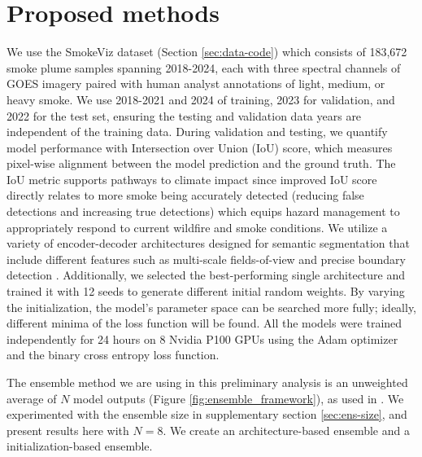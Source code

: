 \documentclass{article}
\begin{document}
\section{Proposed methods} 
We use the SmokeViz dataset (Section \ref{sec:data-code}) which consists of 183,672 smoke plume samples spanning 2018-2024, each with three spectral channels of GOES imagery paired with human analyst annotations of light, medium, or heavy smoke. We use 2018-2021 and 2024 of training, 2023 for validation, and 2022 for the test set, ensuring the testing and validation data years are independent of the training data. During validation and testing, we quantify model performance with Intersection over Union (IoU) score, which measures pixel-wise alignment between the model prediction and the ground truth. The IoU metric supports pathways to climate impact since improved IoU score directly relates to more smoke being accurately detected (reducing false detections and increasing true detections) which equips hazard management to appropriately respond to current wildfire and smoke conditions.
We utilize a variety of encoder-decoder architectures designed for semantic segmentation that include different features such as multi-scale fields-of-view and precise boundary detection \citep{dlv3p,PAN,UNetpp}. Additionally, we selected the best-performing single architecture and trained it with 12 seeds to generate different initial random weights. By varying the initialization, the model's parameter space can be searched more fully; ideally, different minima of the loss function will be found. All the models were trained independently for 24 hours on 8 Nvidia P100 GPUs using the Adam optimizer and the binary cross entropy loss function. 

The ensemble method we are using in this preliminary analysis is an unweighted average of $N$ model outputs (Figure \ref{fig:ensemble_framework}), as used in \citep{nn-ensemble2}. We experimented with the ensemble size in supplementary section \ref{sec:ens-size}, and present results here with $N=8$. We create an architecture-based ensemble and a initialization-based ensemble.
\end{document}
